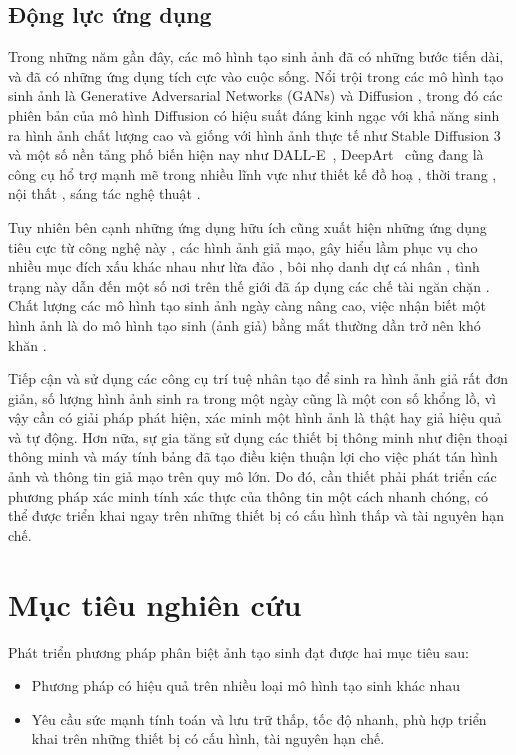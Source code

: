 \subsection{Động lực ứng dụng}
Trong những năm gần đây, các mô hình tạo sinh ảnh đã có những bước tiến dài, và đã có những ứng dụng tích cực vào cuộc sống. Nổi trội trong các mô hình tạo sinh ảnh là Generative Adversarial Networks \cite{Goodfellow2014GenerativeAN} (GANs) và Diffusion \cite{Ho2020DenoisingDP}, trong đó các phiên bản của mô hình Diffusion có hiệu suất đáng kinh ngạc với khả năng sinh ra hình ảnh chất lượng cao và giống với hình ảnh thực tế như Stable Diffusion 3~\cite{Esser2024ScalingRF} và một số nền tảng phố biến hiện nay như  DALL-E~\cite{dalle2}, DeepArt~\cite{deepart} cũng đang là công cụ hổ trợ mạnh mẽ trong nhiều lĩnh vực như thiết kế đồ hoạ \cite{CasteleiroPitrez2024GenerativeAI,Shin2024CanPM}, thời trang \cite{8769486}, nội thất \cite{Chen2020ApplicationOA}, sáng tác nghệ thuật \cite{Ai_won_an_art_contest}. 

Tuy nhiên bên cạnh những ứng dụng hữu ích cũng xuất hiện những ứng dụng tiêu cực từ công nghệ này \cite{DBLP-abs-2107-10139}, các hình ảnh giả mạo, gây hiểu lầm phục vụ cho nhiều mục đích xấu khác nhau như lừa đảo \cite{Ai_chief_financial_officer}, bôi nhọ danh dự cá nhân \cite{VirginiaDeepfake}, tình trạng này dẫn đến một số nơi trên thế giới đã áp dụng các chế tài ngăn chặn \cite{CaliforniaDeepfakes}. Chất lượng các mô hình tạo sinh ảnh ngày càng nâng cao, việc nhận biết một hình ảnh là do mô hình tạo sinh (ảnh giả) bằng mắt thường dần trở nên khó khăn \cite{spottingai}. 

Tiếp cận và sử dụng các công cụ trí tuệ nhân tạo để sinh ra hình ảnh giả rất đơn giản, số lượng hình ảnh sinh ra trong một ngày cũng là một con số khổng lồ, vì vậy cần có giải pháp phát hiện, xác minh một hình ảnh là thật hay giả hiệu quả và tự động. Hơn nữa, sự gia tăng sử dụng các thiết bị thông minh như điện thoại thông minh và máy tính bảng đã tạo điều kiện thuận lợi cho việc phát tán hình ảnh và thông tin giả mạo trên quy mô lớn. Do đó, cần thiết phải phát triển các phương pháp xác minh tính xác thực của thông tin một cách nhanh chóng, có thể được triển khai ngay trên những thiết bị có cấu hình thấp và tài nguyên hạn chế.
%
\section{Mục tiêu nghiên cứu}
Phát triển phương pháp phân biệt ảnh tạo sinh đạt được hai mục tiêu sau:
\begin{itemize}
	\item Phương pháp có hiệu quả trên nhiều loại mô hình tạo sinh khác nhau
	\item Yêu cầu sức mạnh tính toán và lưu trữ thấp, tốc độ nhanh, phù hợp triển khai trên những thiết bị có cấu hình, tài nguyên hạn chế.
\end{itemize}
% 
